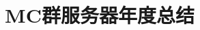 \documentclass{ctexbeamer}
\title{MC群服务器年度总结}
\author{}
\date{}
\begin{document}
\frame{\titlepage}



\end{document}
